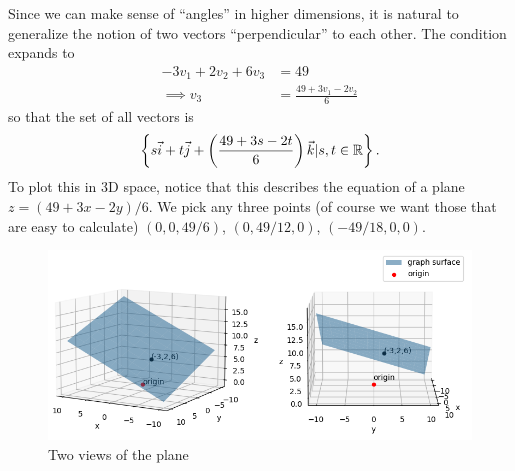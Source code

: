 Since we can make sense of ``angles'' in higher dimensions, it is natural to generalize the notion of two vectors ``perpendicular'' to each other.
\label{plane_projection}
The condition expands to \begin{align*}
	-3v_1+2v_2+6v_3 &= 49 \\
	\implies v_3 &= \frac{49+3v_1 - 2v_2}{6}  
\end{align*}
so that the set of all vectors is \[
	\left\{s \vec{i}+t \vec{j}+\left(\frac{49+3s - 2t}{6}\right) \vec{k} | s,t\in\mathbb{R}\right\}.
\]
To plot this in 3D space, notice that this describes the equation of a plane $z={(49+3x-2y)}/{6}$. We pick any three points (of course we want those that are easy to calculate) $(0,0,49/6)$, $(0,49/12,0)$, $(-49/18,0,0)$.

\begin{figure}
	\centering
	\includegraphics[width=\textwidth]{coordinate_geometry/plane2.png}
	\caption{Two views of the plane}
\end{figure}\ \\

